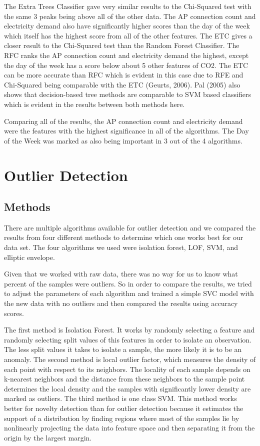 \documentclass[letterpaper, 12 pt, conference]{ieeeconf}  %
\begin{document}
The Extra Trees Classifier gave very similar results to the Chi-Squared test with the same 3 peaks being above all of the other data. The AP connection count and electricity demand also have significantly higher scores than the day of the week which itself has the highest score from all of the other features. The ETC gives a closer result to the Chi-Squared test than the Random Forest Classifier. The RFC ranks the AP connection count and electricity demand the highest, except the day of the week has a score below about 5 other features of CO2. The ETC can be more accurate than RFC which is evident in this case due to RFE and Chi-Squared being comparable with the ETC (Geurts, 2006). Pal (2005) also shows that decision-based tree methods are comparable to SVM based classifiers which is evident in the results between both methods here.

Comparing all of the results, the AP connection count and electricity demand were the features with the highest significance in all of the algorithms. The Day of the Week was marked as also being important in 3 out of the 4 algorithms.


\section{Outlier Detection}
\subsection{Methods}

There are multiple algorithms available for outlier detection and we compared the results from four different methods to determine which one works best for our data set. The four algorithms we used were isolation forest, LOF, SVM, and elliptic envelope.
        
Given that we worked with raw data, there was no way for us to know what percent of the samples were outliers. So in order to compare the results, we tried to adjust the parameters of each algorithm and trained a simple SVC model with the new data with no outliers and then compared the results using accuracy scores. 
        
The first method is Isolation Forest. It works by randomly selecting a feature and randomly selecting split values of this features in order to isolate an observation. The less split values it takes to isolate a sample, the more likely it is to be an anomaly. The second method is local outlier factor, which measures the density of each point with respect to its neighbors. The locality of each sample depends on k-nearest neighbors and the distance from these neighbors to the sample point determines the local density and the samples with significantly lower density are marked as outliers. The third method is one class SVM. This method works better for novelty detection than for outlier detection because it estimates the support of a distribution by finding regions where most of the samples lie by nonlinearly projecting the data into feature space and then separating it from the origin by the largest margin. 
\end{document}
